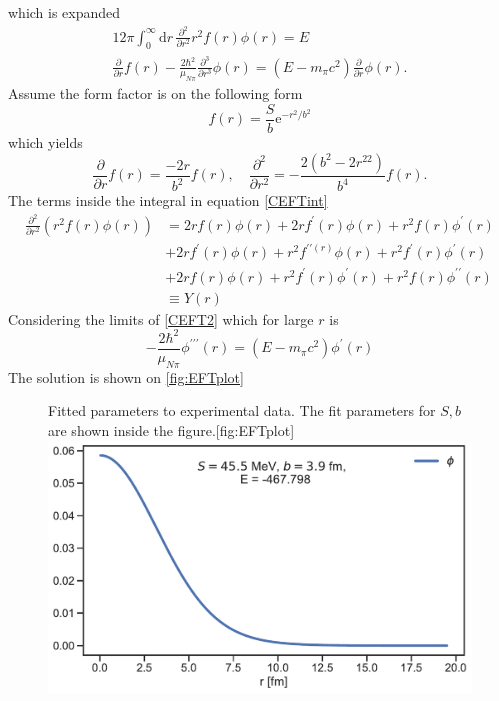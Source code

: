 which is expanded
\begin{align}\label{CEFTint}
    12\pi \int_0^\infty \text{d}r \, \frac{\partial^2}{\partial r^2}r^2f(r)\phi(r) =E \\
    \frac{\partial}{\partial r}f(r)-\frac{2\hbar^2}{\mu_{N\pi}} \frac{\partial^3}{\partial r^3}\phi(r) = (E-m_\pi c^2)\frac{\partial}{\partial r}\phi(r)\label{CEFT2}.
\end{align}
Assume the form factor is on the following form
\begin{equation}
    f(r) = \frac{S}{b}\text{e}^{-r^2/b^2}
\end{equation}
which yields
\begin{equation}
    \frac{\partial}{\partial r} f(r) = \frac{-2r}{b^2}f(r), \quad \frac{\partial^2}{\partial r^2}=-\frac{2(b^2-2r^22)}{b^4}f(r).
\end{equation}
The terms inside the integral in equation \eqref{CEFTint} 
\begin{align}
    \frac{\partial^2}{\partial r^2}(r^2f(r)\phi(r)) & = 2rf(r)\phi(r)+2rf^\prime(r)\phi(r)+r^2f(r)\phi ^\prime(r)
    \\&+2rf^\prime(r)\phi(r)+r^2f^{\prime\prime(r)}\phi(r)+r^2f^\prime(r)\phi^\prime(r)\\
    &+2rf(r)\phi(r)+r^2f^\prime(r)\phi^\prime (r)+r^2f(r)\phi^{\prime\prime}(r) \\&\equiv Y(r)
\end{align}
Considering the limits of \eqref{CEFT2} which for large $r$ is
\begin{equation}
    -\frac{2\hbar^2}{\mu_{N\pi}}\phi^{\prime\prime\prime}(r) =(E-m_\pi c^2)\phi^\prime(r)
\end{equation}
The solution is shown on \ref{fig:EFTplot}
\begin{figure}[H]
    \begin{sidecaption}{Fitted parameters to experimental data. The fit parameters for $S,b$ are shown inside the figure.}[fig:EFTplot]
    \includegraphics[width=\linewidth]{Figures/EFToperator.pdf}
    \end{sidecaption}
\end{figure}
